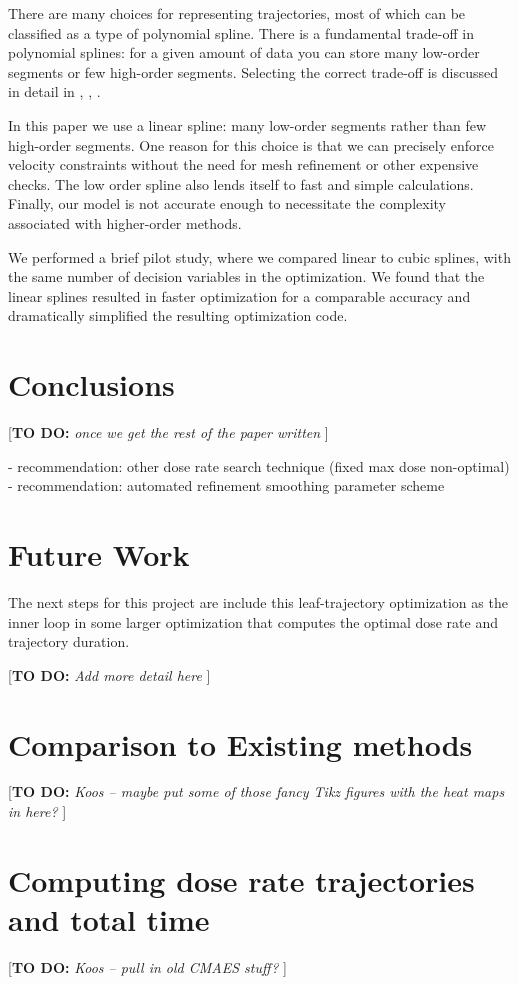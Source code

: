\documentclass{iopart}
\newcommand{\todo}[1]{{\color{lightblue}\par {[{\bf TO DO: } {\em #1}} ] \\    }}
\begin{document}
There are many choices for representing trajectories, most of which can be classified as a type of polynomial spline. There is a fundamental trade-off in polynomial splines: for a given amount of data you can store many low-order segments or few high-order segments. Selecting the correct trade-off is discussed in detail in \cite{kelly2017introduction}, \cite{Betts2010}, \cite{Darby2011a}. 

In this paper we use a linear spline: many low-order segments rather than few high-order segments. One reason for this choice is that we can precisely enforce velocity constraints without the need for mesh refinement or other expensive checks. The low order spline also lends itself to fast and simple calculations. Finally, our model is not accurate enough to necessitate the complexity associated with higher-order methods.

We performed a brief pilot study, where we compared linear to cubic splines, with the same number of decision variables in the optimization. We found that the linear splines resulted in faster optimization for a comparable accuracy and dramatically simplified the resulting optimization code.


\section{Conclusions}

\todo{once we get the rest of the paper written}
- recommendation: other dose rate search technique (fixed max dose non-optimal)
- recommendation: automated refinement smoothing parameter scheme

\section{Future Work}

The next steps for this project are include this leaf-trajectory optimization as the inner loop in some larger optimization that computes the optimal dose rate and trajectory duration.

\todo{Add more detail here}


\appendix

\section{Comparison to Existing methods}

\todo{Koos  --  maybe put some of those fancy Tikz figures with the heat maps in here?}

\section{Computing dose rate trajectories and total time}
\label{CMAES}

\todo{Koos --  pull in old CMAES stuff?}



\end{document}
